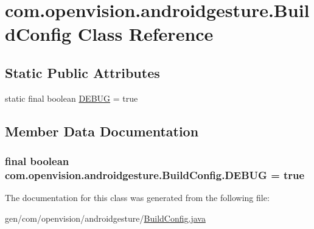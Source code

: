 \hypertarget{classcom_1_1openvision_1_1androidgesture_1_1_build_config}{\section{com.\-openvision.\-androidgesture.\-Build\-Config \-Class \-Reference}
\label{classcom_1_1openvision_1_1androidgesture_1_1_build_config}
}
\subsection*{\-Static \-Public \-Attributes}
\begin{DoxyCompactItemize}
\item 
static final boolean \hyperlink{classcom_1_1openvision_1_1androidgesture_1_1_build_config_a281d5059186d6f9dfc79df1fb3b4273e}{\-D\-E\-B\-U\-G} = true
\end{DoxyCompactItemize}


\subsection{\-Member \-Data \-Documentation}
\hypertarget{classcom_1_1openvision_1_1androidgesture_1_1_build_config_a281d5059186d6f9dfc79df1fb3b4273e}{
\subsubsection[{\-D\-E\-B\-U\-G}]{\setlength{\rightskip}{0pt plus 5cm}final boolean {\bf com.\-openvision.\-androidgesture.\-Build\-Config.\-D\-E\-B\-U\-G} = true}}\label{classcom_1_1openvision_1_1androidgesture_1_1_build_config_a281d5059186d6f9dfc79df1fb3b4273e}


\-The documentation for this class was generated from the following file\-:\begin{DoxyCompactItemize}
\item 
gen/com/openvision/androidgesture/\hyperlink{_build_config_8java}{\-Build\-Config.\-java}\end{DoxyCompactItemize}
